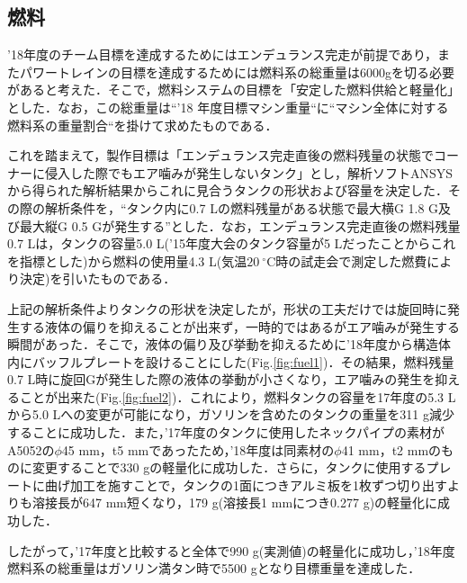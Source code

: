 \subsection{燃料}
’18年度のチーム目標を達成するためにはエンデュランス完走が前提であり，またパワートレインの目標を達成するためには燃料系の総重量は6000gを切る必要があると考えた．そこで，燃料システムの目標を「安定した燃料供給と軽量化」とした．なお，この総重量は“’18 年度目標マシン重量“に“マシン全体に対する燃料系の重量割合“を掛けて求めたものである．

これを踏まえて，製作目標は「エンデュランス完走直後の燃料残量の状態でコーナーに侵入した際でもエア噛みが発生しないタンク」とし，解析ソフトANSYSから得られた解析結果からこれに見合うタンクの形状および容量を決定した．その際の解析条件を，“タンク内に0.7 Lの燃料残量がある状態で最大横G 1.8 G及び最大縦G 0.5 Gが発生する”とした．なお，エンデュランス完走直後の燃料残量0.7 Lは，タンクの容量5.0 L(’15年度大会のタンク容量が5 Lだったことからこれを指標とした)から燃料の使用量4.3 L(気温$20 \ {}^\circ\mathrm{C}$時の試走会で測定した燃費により決定)を引いたものである． 

上記の解析条件よりタンクの形状を決定したが，形状の工夫だけでは旋回時に発生する液体の偏りを抑えることが出来ず，一時的ではあるがエア噛みが発生する瞬間があった．そこで，液体の偏り及び挙動を抑えるために’18年度から構造体内にバッフルプレートを設けることにした(Fig.\ref{fig:fuel1})．その結果，燃料残量0.7 L時に旋回Gが発生した際の液体の挙動が小さくなり，エア噛みの発生を抑えることが出来た(Fig.\ref{fig:fuel2})．これにより，燃料タンクの容量を17年度の5.3 Lから5.0 Lへの変更が可能になり，ガソリンを含めたのタンクの重量を311 g減少することに成功した．また，’17年度のタンクに使用したネックパイプの素材がA5052の$\phi$45 mm，t5 mmであったため，’18年度は同素材の$\phi$41 mm，t2 mmのものに変更することで330 gの軽量化に成功した．さらに，タンクに使用するプレートに曲げ加工を施すことで，タンクの1面につきアルミ板を1枚ずつ切り出すよりも溶接長が647 mm短くなり，179 g(溶接長1 mmにつき0.277 g)の軽量化に成功した．

したがって，’17年度と比較すると全体で990 g(実測値)の軽量化に成功し，’18年度燃料系の総重量はガソリン満タン時で5500 gとなり目標重量を達成した．
